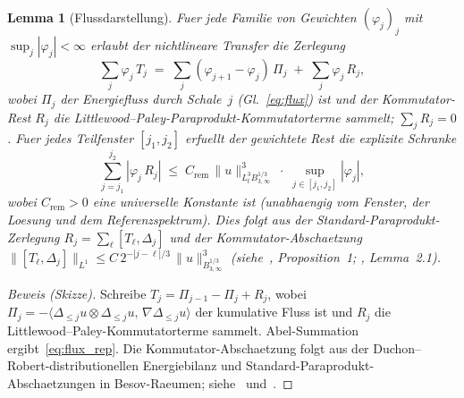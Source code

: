 \documentclass[12pt,a4paper]{article}
\theoremstyle{definition}
\theoremstyle{plain}
\newtheorem{lemma}[definition]{Lemma}
\theoremstyle{remark}
\begin{document}
\begin{lemma}[Flussdarstellung]\label{lem:flux}
Fuer jede Familie von Gewichten $(\varphi_j)_j$ mit
$\sup_j |\varphi_j| < \infty$ erlaubt der nichtlineare Transfer die
Zerlegung
\begin{equation}\label{eq:flux_rep}
  \sum_j \varphi_j\,T_j
  \;=\;
  \sum_j (\varphi_{j+1} - \varphi_j)\,\Pi_j
  \;+\;
  \sum_j \varphi_j\,R_j,
\end{equation}
wobei $\Pi_j$ der Energiefluss durch Schale~$j$
(Gl.~\eqref{eq:flux}) ist und der Kommutator-Rest $R_j$ die
Littlewood--Paley-Paraprodukt-Kommutatorterme sammelt; $\sum_j R_j = 0$.
Fuer jedes Teilfenster $[j_1, j_2]$ erfuellt der gewichtete Rest die
\emph{explizite Schranke}
\begin{equation}\label{eq:remainder-bound}
  \sum_{j=j_1}^{j_2} |\varphi_j\,R_j|
  \;\le\;
  C_{\mathrm{rem}}\,\|u\|_{L^3_t B^{1/3}_{3,\infty}}^3
  \;\cdot\;
  \sup_{j \in [j_1,j_2]} |\varphi_j|,
\end{equation}
wobei $C_{\mathrm{rem}} > 0$ eine universelle Konstante ist (unabhaengig
vom Fenster, der Loesung und dem Referenzspektrum). Dies folgt aus der
Standard-Paraprodukt-Zerlegung $R_j = \sum_{\ell} [T_\ell,
\Delta_j]$ und der Kommutator-Abschaetzung $\|[T_\ell, \Delta_j]\|_{L^1}
\le C\,2^{-|j-\ell|/3}\,\|u\|_{B^{1/3}_{3,\infty}}^3$
(siehe~\cite{CET94}, Proposition~1; \cite{DR00}, Lemma~2.1).
\end{lemma}

\begin{proof}[Beweis (Skizze)]
Schreibe $T_j = \Pi_{j-1} - \Pi_j + R_j$, wobei
$\Pi_j = -\langle \Delta_{\le j} u \otimes \Delta_{\le j} u,\,
\nabla \Delta_{\le j} u \rangle$ der kumulative Fluss ist
und $R_j$ die Littlewood--Paley-Kommutatorterme sammelt.
Abel-Summation ergibt~\eqref{eq:flux_rep}. Die Kommutator-Abschaetzung
folgt aus der Duchon--Robert-distributionellen Energiebilanz und
Standard-Paraprodukt-Abschaetzungen in Besov-Raeumen;
siehe~\cite{DR00} und~\cite{CET94}.
\end{proof}
\end{document}
